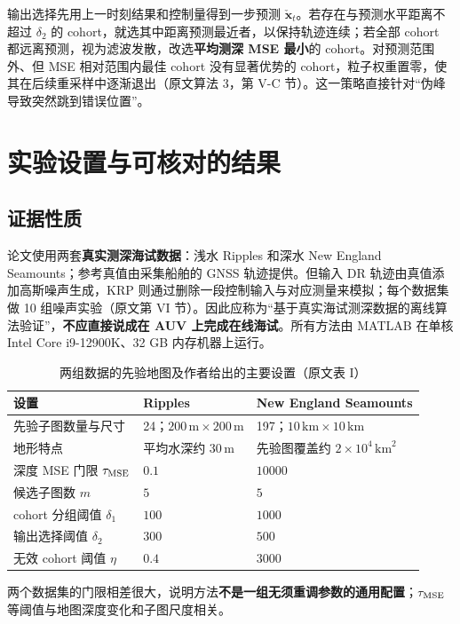 \documentclass[11pt]{article}
\begin{document}
输出选择先用上一时刻结果和控制量得到一步预测 $\check{\mathbf x}_t$。若存在与预测水平距离不超过 $\delta_2$ 的 cohort，就选其中距离预测最近者，以保持轨迹连续；若全部 cohort 都远离预测，视为滤波发散，改选\textbf{平均测深 MSE 最小}的 cohort。对预测范围外、但 MSE 相对范围内最佳 cohort 没有显著优势的 cohort，粒子权重置零，使其在后续重采样中逐渐退出（原文算法 3，第 V-C 节）。这一策略直接针对“伪峰导致突然跳到错误位置”。

\section{实验设置与可核对的结果}

\subsection{证据性质}

论文使用两套\textbf{真实测深海试数据}：浅水 Ripples 和深水 New England Seamounts；参考真值由采集船舶的 GNSS 轨迹提供。但输入 DR 轨迹由真值添加高斯噪声生成，KRP 则通过删除一段控制输入与对应测量来模拟；每个数据集做 10 组噪声实验（原文第 VI 节）。因此应称为“基于真实海试测深数据的离线算法验证”，\textbf{不应直接说成在 AUV 上完成在线海试}。所有方法由 MATLAB 在单核 Intel Core i9-12900K、32 GB 内存机器上运行。

\begin{table}[htbp]
\centering\small
\caption{两组数据的先验地图及作者给出的主要设置（原文表 I）}
\begin{tabularx}{\linewidth}{lYY}
\toprule
设置 & Ripples & New England Seamounts\\
\midrule
先验子图数量与尺寸 & 24；$200\,\mathrm m\times200\,\mathrm m$ & 197；$10\,\mathrm{km}\times10\,\mathrm{km}$\\
地形特点 & 平均水深约 $30\,\mathrm m$ & 先验图覆盖约 $2\times10^4\,\mathrm{km}^2$\\
深度 MSE 门限 $\tau_{\rm MSE}$ & $0.1$ & $10000$\\
候选子图数 $m$ & $5$ & $5$\\
cohort 分组阈值 $\delta_1$ & $100$ & $1000$\\
输出选择阈值 $\delta_2$ & $300$ & $500$\\
无效 cohort 阈值 $\eta$ & $0.4$ & $3000$\\
\bottomrule
\end{tabularx}
\end{table}

两个数据集的门限相差很大，说明方法\textbf{不是一组无须重调参数的通用配置}；$\tau_{\rm MSE}$ 等阈值与地图深度变化和子图尺度相关。
\end{document}
